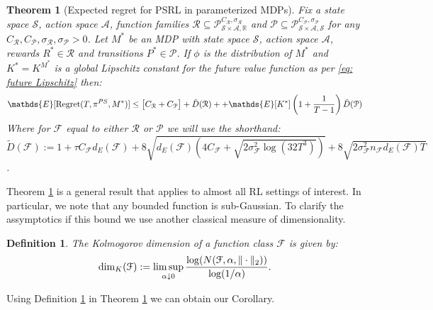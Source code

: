 \documentclass{article}
\newtheorem{theorem}{Theorem}
\newtheorem{mydef}{Definition}
\newcommand{\Exp}{\mathds{E}}
\newcommand{\Real}{\mathds{R}}
\newcommand{\Pc}{\mathcal{P}}
\newcommand{\Fc}{\mathcal{F}}
\newcommand{\Rc}{\mathcal{R}}
\newcommand{\Sc}{\mathcal{S}}
\newcommand{\Ac}{\mathcal{A}}
\begin{document}
\begin{theorem}[Expected regret for PSRL in parameterized MDPs]
\label{thm: main regret} \hspace{0.00000000000001mm} \newline
Fix a state space $\Sc$, action space $\Ac$, function families
$\Rc \subseteq \Pc^{C_\Rc,\sigma_\Rc}_{\Sc \times \Ac,\Real}$ and
$\Pc \subseteq \Pc^{C_\Pc,\sigma_\Pc}_{\Sc \times \Ac,\Sc}$ for any $C_\Rc, C_\Pc, \sigma_\Rc, \sigma_\Pc >0$.
Let $M^*$ be an MDP with state space $\Sc$, action space $\Ac$, rewards $R^* \in \Rc $ and transitions $P^* \in \Pc $.
If $\phi$ is the distribution of $M^*$ and $K^* = K^{M^*}$ is a global Lipschitz constant for the future value function as per \eqref{eq: future Lipschitz} then:
\begin{eqnarray}
\label{eq: reg proof}
    \Exp[{\rm Regret}(T,\pi^{PS},M^*)] \le \big[ C_\Rc + C_\Pc \big] + \tilde{D}(\Rc)
    + + \Exp[K^*]\left(1+\frac{1}{T-1}\right) \tilde{D}(\Pc)
\end{eqnarray}
Where for $\Fc$ equal to either $\Rc$ or $\Pc$ we will use the shorthand: \\
$\tilde{D}(\Fc) := 1 + \tau C_\Fc d_E(\Fc) + 8\sqrt{d_E(\Fc)(4C_\Fc + \sqrt{2\sigma_\Fc^2 \log(32T^3)})} + 8\sqrt{2 \sigma_\Fc^2 n_\Fc d_E(\Fc) T}$.
\end{theorem}
Theorem \ref{thm: main regret} is a general result that applies to almost all RL settings of interest.
In particular, we note that any bounded function is sub-Gaussian.
To clarify the assymptotics if this bound we use another classical measure of dimensionality.
\begin{mydef}
\label{def: kol}
The Kolmogorov dimension of a function class $\Fc$ is given by:
$$ {\rm dim}_K(\Fc) := \limsup_{\alpha \downarrow 0} \frac{\log(N(\Fc,\alpha,\|\cdot\|_2))}{\log(1/\alpha)} .$$
\end{mydef}
Using Definition \ref{def: kol} in Theorem \ref{thm: main regret} we can obtain our Corollary.
\end{document}
